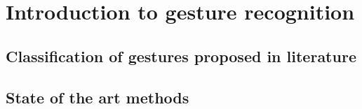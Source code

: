 
\chapter{Introduction to gesture recognition}

\section{Classification of gestures proposed in literature}

\section{State of the art methods}

